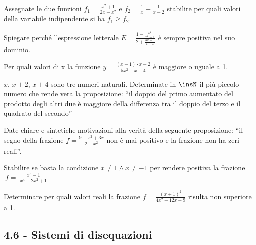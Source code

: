 \begin{esercizio}[\Ast]
 \label{ese:4.68}
Assegnate le due funzioni $f_1=\frac{x^2+1}{2x-x^2}$ e $f_2=\frac 1 x+\frac 1{x-2}$ stabilire per quali valori della variabile indipendente si ha $f_1\ge f_2$.
\end{esercizio}

\begin{esercizio}
 \label{ese:4.69}
Spiegare perché l’espressione letterale $E=\frac{1-\frac{x^2}{x^2-1}}{2+\frac{3x-1}{1-x}}$ è sempre positiva nel suo dominio.
\end{esercizio}

\begin{esercizio}[\Ast]
 \label{ese:4.70}
Per quali valori di x la funzione $y=\frac{(x-1)\cdot x-2}{5x^2-x-4}$ è maggiore o uguale a 1.
\end{esercizio}

\begin{esercizio}[\Ast]
 \label{ese:4.71}
$ x $, $ x+2 $, $ x+4 $ sono tre numeri naturali. Determinate in $ \insN $ il più piccolo numero che rende vera la proposizione: “il doppio del primo aumentato del prodotto degli altri due è maggiore della differenza tra il doppio del terzo e il quadrato del secondo”
\end{esercizio}

\begin{esercizio}
 \label{ese:4.72}
Date chiare e sintetiche motivazioni alla verità della seguente proposizione: “il segno della frazione $f=\frac{9-x^2+3x}{2+x^2}$ non è mai positivo e la frazione non ha zeri reali”.
\end{esercizio}

\begin{esercizio}
 \label{ese:4.73}
Stabilire se basta la condizione $x\neq 1\wedge x\neq -1$ per rendere positiva la frazione $~f=~\frac{x^3-1}{x^4-2x^2+1}$
\end{esercizio}

\begin{esercizio}
 \label{ese:4.74}
Determinare per quali valori reali la frazione $f=\frac{(x+1)^2}{4x^2-12x+9}$ risulta non superiore a 1.
\end{esercizio}

\newpage
\subsection*{4.6 - Sistemi di disequazioni}

